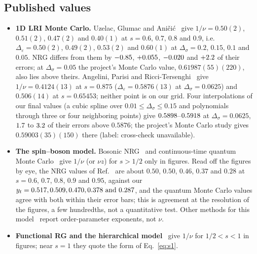 \documentclass[10pt,a4paper]{article}
\newcommand{\Ds}{\Delta_\sigma}
\newcommand{\De}{\Delta_\varepsilon}
\newcommand{\dtot}{\delta_{\rm tot}}
\begin{document}
\begin{table}[ht]\centering\scriptsize\setlength{\tabcolsep}{3.5pt}
\caption{NRG against the 1D cluster Monte Carlo study at the common points. MC value with $\sigma_{\rm stat}$ and $\sigma_{\rm sys}$ in
units of the last digit, and its label (Sec.~\ref{sec:mc}); NRG minus MC; ``ratio'' is $|{\rm NRG}-{\rm MC}|$ divided by
$\sigma_{\rm stat}+\sigma_{\rm sys}+\dtot$ (shown also for the cross-check-failed points, which are not infinite-size values); MC
crossing extrapolation with $\sigma_\infty$ and $\Delta_{\omega'}$. MC values are quoted as that study gives them. $^\ast$Not
converged in NRG, not used.}\label{tab:mc}

\end{table}

\subsection{Published values}\label{sec:literature}
\begin{itemize}
\item \textbf{1D LRI Monte Carlo.} Uzelac, Glumac and Ani\v{c}i\'c~\cite{UGA01} give $1/\nu=0.50(2)$, $0.51(2)$, $0.47(2)$ and $0.40(1)$ at
  $s=0.6$, $0.7$, $0.8$ and $0.9$, i.e.\ $\De=0.50(2)$, $0.49(2)$, $0.53(2)$ and $0.60(1)$ at $\Ds=0.2$, $0.15$, $0.1$ and $0.05$. NRG
  differs from them by $-0.85$, $+0.055$, $-0.020$ and $+2.2$ of their errors; at $\Ds=0.05$ the
  project's Monte Carlo value, $0.61987(55)(220)$, also lies above theirs. Angelini, Parisi and Ricci-Tersenghi~\cite{APR14} give
  $1/\nu=0.4124(13)$ at $s=0.875$ ($\De=0.5876(13)$ at $\Ds=0.0625$) and $0.506(14)$ at $s=0.65453$; neither point is on our grid.
  Four interpolations of our final values (a cubic spline over $0.01\le\Ds\le0.15$ and polynomials through three or four neighboring
  points) give $0.5898$--$0.5918$ at $\Ds=0.0625$, $1.7$ to $3.2$ of their errors above $0.5876$; the project's
  Monte Carlo study gives $0.59003(35)(150)$ there (label: cross-check unavailable).
\item \textbf{The spin--boson model.} Bosonic NRG~\cite{Bulla2003,Vojta2005} and continuous-time quantum Monte
  Carlo~\cite{WRVB09} give $1/\nu$ (or $\nu z$) for $s>1/2$ only in figures. Read off the figures by eye, the NRG values of
  Ref.~\cite{Vojta2005} are about $0.50$, $0.50$, $0.46$, $0.37$ and $0.28$ at $s=0.6$, $0.7$, $0.8$, $0.9$ and $0.95$, against our
  $y_t=0.517, 0.509, 0.470, 0.378\text{ and }0.287$, and the quantum Monte Carlo values agree with both within their error bars; this is
  agreement at the resolution of the figures, a few hundredths, not a quantitative test. Other methods for this
  model~\cite{AF09,Guo2012} report order-parameter exponents, not $\nu$.
\item \textbf{Functional RG and the hierarchical model}~\cite{PGTD26} give $1/\nu$ for $1/2<s<1$ in figures; near $s=1$ they quote
  the form of Eq.~\eqref{eq:s1}.
\end{itemize}
\end{document}
